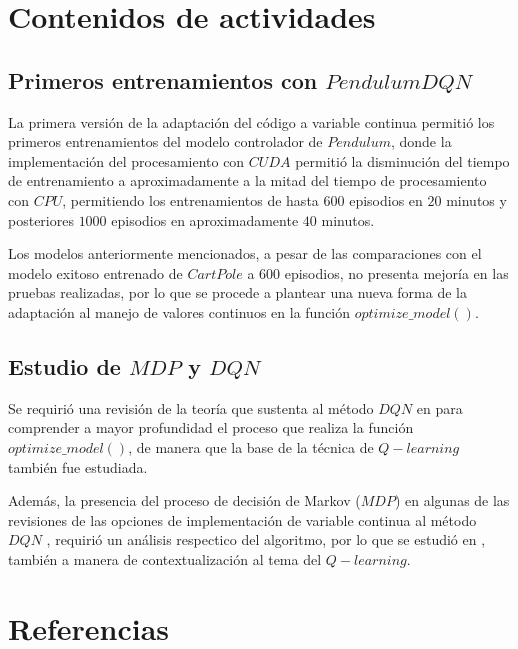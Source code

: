 \documentclass[12pt]{article}
\begin{document}

\section*{Contenidos de actividades}

\subsection*{Primeros entrenamientos con $PendulumDQN$}

La primera versión de la adaptación del código a variable continua permitió los primeros entrenamientos del modelo controlador de $Pendulum$, donde la implementación del procesamiento con $CUDA$ permitió la disminución del tiempo de entrenamiento a aproximadamente a la mitad del tiempo de procesamiento con $CPU$, permitiendo los entrenamientos de hasta $600$ episodios en $20$ minutos y posteriores $1000$ episodios en aproximadamente $40$ minutos.

Los modelos anteriormente mencionados, a pesar de las comparaciones con el modelo exitoso entrenado de $CartPole$ a $600$ episodios, no presenta mejoría en las pruebas realizadas, por lo que se procede a plantear una nueva forma de la adaptación al manejo de valores continuos en la función $optimize\_ model()$.

\subsection*{Estudio de $MDP$ y $DQN$}

Se requirió una revisión de la teoría que sustenta al método $DQN$ en \cite{PAlvaradoDQN1} para comprender a mayor profundidad el proceso que realiza la función $optimize\_model()$, de manera que la base de la técnica de $Q-learning$ también fue estudiada.

Además, la presencia del proceso de decisión de Markov ($MDP$) en algunas de las revisiones de las opciones de implementación de variable continua al método $DQN$ \cite{CartPoleRLcrtl1}, requirió un análisis respectico del algoritmo, por lo que se estudió en \cite{PAlvaradoMDP1}, también a manera de contextualización al tema del $Q-learning$.




\newpage

\section*{Referencias}
\renewcommand\refname{}


\end{document}
